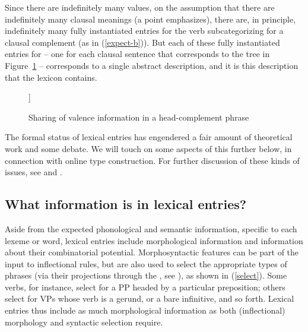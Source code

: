 \documentclass[output=paper
 	        ,biblatex
                ,babelshorthands
                ,newtxmath
                ,draftmode
                ,colorlinks, citecolor=brown
]{langscibook}
\begin{document}
Since there are indefinitely many  values, on the assumption that there are indefinitely many clausal meanings (a point \citealt[8--9]{Jackendoff1990} emphasizes), there are, in principle, indefinitely many fully instantiated entries for the verb  subcategorizing for a clausal complement (as in (\ref{expect-b})). 
But each of these fully instantiated entries for  -- one for each clausal sentence that corresponds to the tree in Figure~\ref{expect-b-tree} -- corresponds to a single abstract description, and it is this description that the lexicon contains. 

\begin{figure}
	\begin{forest}
	[ [{\avm{[comps & < \1 >]}} ] 
	[{\avm{[synsem & \1 ]}} ] ]
\end{forest}	
\caption{\label{expect-b-tree} Sharing of valence information in a head-complement phrase}
\end{figure}


The formal status of lexical entries has engendered a fair amount of theoretical work and some debate.
We will touch on some aspects of this further below, in connection with online type construction.
For further discussion of these kinds of issues, see  and .

\subsection{What information is in lexical entries?}

Aside from the expected phonological and semantic information, specific to each lexeme or word, lexical entries include morphological information and information about their combinatorial potential. Morphosyntactic features can be part of the input to inflectional rules, but are also used to select the appropriate types of phrases (via their projections through the , see \crossrefchapteralt[\pageref{page-hfp}]{properties}), as shown in (\ref{select}). Some verbs, for instance, select for a PP headed by a particular preposition; others select for VPs whose verb is a gerund, or a bare infinitive, and so forth. Lexical entries thus include as much morphological information as both (inflectional) morphology and syntactic selection require.
\end{document}
